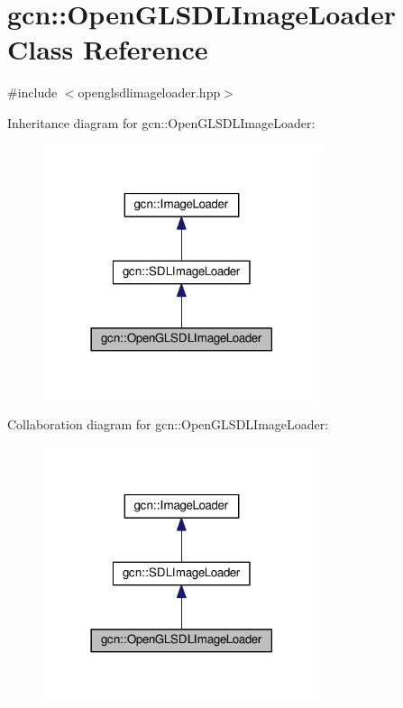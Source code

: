 \hypertarget{classgcn_1_1OpenGLSDLImageLoader}{}\section{gcn\+:\+:Open\+G\+L\+S\+D\+L\+Image\+Loader Class Reference}
\label{classgcn_1_1OpenGLSDLImageLoader}


{\ttfamily \#include $<$openglsdlimageloader.\+hpp$>$}



Inheritance diagram for gcn\+:\+:Open\+G\+L\+S\+D\+L\+Image\+Loader\+:\nopagebreak
\begin{figure}[H]
\begin{center}
\leavevmode
\includegraphics[width=230pt]{classgcn_1_1OpenGLSDLImageLoader__inherit__graph}
\end{center}
\end{figure}


Collaboration diagram for gcn\+:\+:Open\+G\+L\+S\+D\+L\+Image\+Loader\+:\nopagebreak
\begin{figure}[H]
\begin{center}
\leavevmode
\includegraphics[width=230pt]{classgcn_1_1OpenGLSDLImageLoader__coll__graph}
\end{center}
\end{figure}
